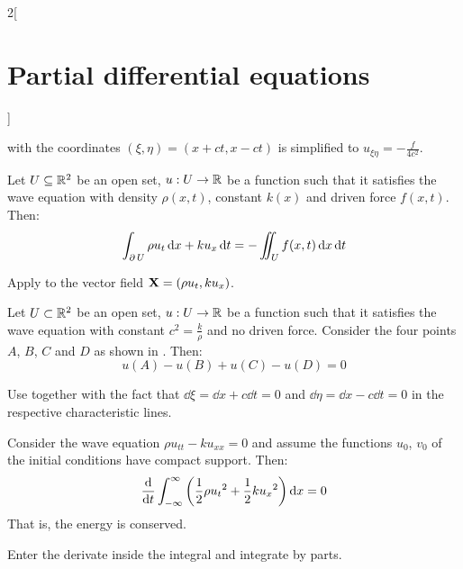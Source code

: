 \documentclass[../../../main_math.tex]{subfiles}
\begin{document}
\begin{multicols}{2}[\section{Partial differential equations}]
\begin{sproof}
     with the coordinates $(\xi, \eta) = (x+ ct,x-ct)$ is simplified to $u_{\xi\eta}=-\frac{f}{4c^2}$.
  \end{sproof}
  \begin{theorem}\label{PDE:greenwave}
    Let $U\subseteq\mathbb{R}^2$ be an open set, $u:U\rightarrow\mathbb{R}$ be a function such that it satisfies the wave equation with density $\rho(x,t)$, constant $k(x)$ and driven force $f(x,t)$. Then:
    $$\int_{\operatorname{\partial}{U}}\rho u_t\dd{x}+k u_x\dd{t}=-\iint_Uf(x,t)\dd{x}\dd{t}$$
  \end{theorem}
  \begin{sproof}
    Apply  to the vector field $\boldsymbol{\mathrm{X}}= (\rho u_t,k u_x)$.
  \end{sproof}
  \begin{proposition}
    Let $U\subset\mathbb{R}^2$ be an open set, $u:U\rightarrow\mathbb{R}$ be a function such that it satisfies the wave equation with constant $c^2=\frac{k}{\rho}$ and no driven force. Consider the four points $A$, $B$, $C$ and $D$ as shown in . Then:
    \begin{equation}\label{PDE:charwaveseq}
      u(A)-u(B)+u(C)-u(D)=0
    \end{equation}
  \end{proposition}
  \begin{sproof}
    Use  together with the fact that $\dd{\xi}=\dd{x}+c\dd{t}=0$ and $\dd{\eta}=\dd{x}-c\dd{t}=0$ in the respective characteristic lines.
  \end{sproof}
  \begin{center}
    \begin{minipage}{\linewidth}
      \centering
      
      \label{PDE:waves-char}
    \end{minipage}
  \end{center}
  \begin{proposition}
    Consider the wave equation $\rho u_{tt}-ku_{xx}=0$ and assume the functions $u_0$, $v_0$ of the initial conditions have compact support. Then: $$\dv{}{t}\int_{-\infty}^\infty\left(\frac{1}{2}\rho{u_t}^2+\frac{1}{2}k{u_x}^2\right)\dd{x}=0$$ That is, the energy is conserved.
  \end{proposition}
  \begin{sproof}
    Enter the derivate inside the integral and integrate by parts.
  \end{sproof}

\end{multicols}
\end{document}
